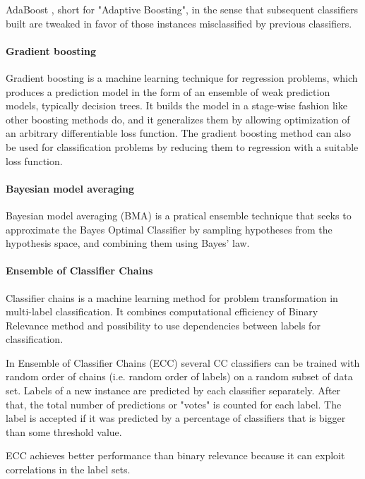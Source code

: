 AdaBoost \cite{freund1997decision}, short for "Adaptive Boosting", in the sense that subsequent classifiers built are tweaked in favor of those instances misclassified by previous classifiers. 

\paragraph{Gradient boosting}
\label{sec:ml:GradientBoosting}
Gradient boosting \cite{friedman2001greedy} is a machine learning technique for regression problems, which produces a prediction model in the form of an ensemble of weak prediction models, typically decision trees. It builds the model in a stage-wise fashion like other boosting methods do, and it generalizes them by allowing optimization of an arbitrary differentiable loss function. The gradient boosting method can also be used for classification problems by reducing them to regression with a suitable loss function.

\paragraph{Bayesian model averaging}

Bayesian model averaging (BMA) \cite{hoeting1999bayesian}  is a pratical ensemble technique that seeks to approximate the Bayes Optimal Classifier by sampling hypotheses from the hypothesis space, and combining them using Bayes' law.

\paragraph{Ensemble of Classifier Chains}

Classifier chains is a machine learning method for problem transformation in multi-label classification. It combines computational efficiency of Binary Relevance method and possibility to use dependencies between labels for classification.  

\cite{read2011classifier} In Ensemble of Classifier Chains (ECC) several CC classifiers can be trained with random order of chains (i.e. random order of labels) on a random subset of data set. Labels of a new instance are predicted by each classifier separately. After that, the total number of predictions or "votes" is counted for each label. The label is accepted if it was predicted by a percentage of classifiers that is bigger than some threshold value.

ECC achieves better performance than binary relevance because it can exploit correlations in the label sets.\cite{mlsp2}

